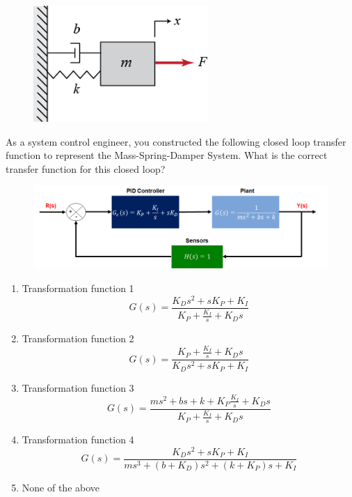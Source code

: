 \begin{enumerate}
\begin{figure}[!htb]
\begin{center}
\includegraphics[scale=0.280]{img/longitudinal_control/image_q5_1.png}
\end{center}
\label{image_q5_1}
\end{figure}

As a system control engineer, you constructed the following closed loop transfer function to represent the Mass-Spring-Damper System. 
What is the correct transfer function for this closed loop? 

\begin{figure}[!htb]
\begin{center}
\includegraphics[scale=0.280]{img/longitudinal_control/image_q5_2.png}
\end{center}
\label{image_q5_2}
\end{figure}

\begin{enumerate}
		\item Transformation function 1
		\begin{equation}
			G(s) = \frac{K_Ds^2 + sK_P + K_I}{K_P + \frac{K_I}{s} + K_Ds} 
		\end{equation}
		\item Transformation function 2
		\begin{equation}
			G(s) = \frac{K_P + \frac{K_I}{s} + K_Ds}{K_Ds^2 + sK_P + K_I} 
		\end{equation}
		\item Transformation function 3
		​\begin{equation}
			G(s) = \frac{ms^2 + bs + k + K_P\frac{K_I}{s} + K_Ds}{K_P + \frac{K_I}{s} +K_Ds} 
		\end{equation}
		\item Transformation function 4
		​\begin{equation}
			G(s) = \frac{K_Ds^2 + sK_P + K_I}{ms^3 + (b + K_D)s^2 + (k + K_P)s + K_I} 
		\end{equation}
		\item None of the above
	\end{enumerate}
		

\end{enumerate}
